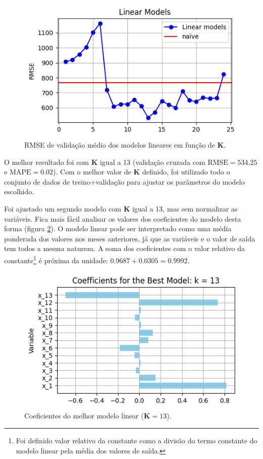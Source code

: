 \documentclass[final,5p]{elsarticle}
\numberwithin{equation}{section}
\begin{document}
    \begin{figure}[hbt!]
        \includegraphics[width=0.95\columnwidth]{B1_LinearModels.png}
        \caption{RMSE de validação médio dos modelos lineares em função de \textbf{K}.}
        \label{fig:modelos_lineares}
    \end{figure}

    O melhor resultado foi com \textbf{K} igual a 13 (validação cruzada com $\text{RMSE} = 534.25$ e $\text{MAPE} = 0.02$). Com o melhor valor de \textbf{K} definido, foi utilizado todo o conjunto de dados de treino+validação para ajustar os parâmetros do modelo escolhido.

    Foi ajustado um segundo modelo com \textbf{K} igual a 13, mas sem normalizar as variáveis. Fica mais fácil analisar os valores dos coeficientes do modelo desta forma (figura \ref{fig:coef_modelo_linear}). O modelo linear pode ser interpretado como uma média ponderada dos valores nos meses anteriores, já que as variáveis e o valor de saída tem todos a mesma natureza. A soma dos coeficientes com o valor relativo da constante\footnote{Foi definido valor relativo da constante como a divisão do termo constante do modelo linear pela média dos valores de saída.} é próxima da unidade: $0.9687 + 0.0305 = 0.9992$.

    \begin{figure}[hbt!]
        \includegraphics[width=0.95\columnwidth]{B1_CoefficientsNoScaling.png}
        \caption{Coeficientes do melhor modelo linear ($\textbf{K} = 13$).}
        \label{fig:coef_modelo_linear}
    \end{figure}
\end{document}
